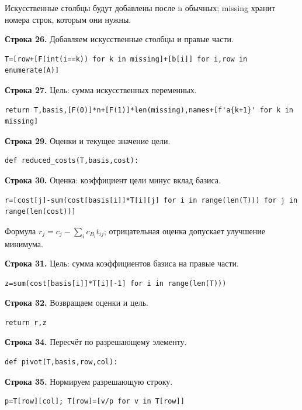 \documentclass[12pt,a4paper]{article}
\begin{document}
Искусственные столбцы будут добавлены после n обычных; missing хранит номера строк, которым они нужны.
\par\textbf{Строка 26.} Добавляем искусственные столбцы и правые части.
\begin{Verbatim}[fontsize=\small,breaklines=true,breakanywhere=true]
    T=[row+[F(int(i==k)) for k in missing]+[b[i]] for i,row in enumerate(A)]
\end{Verbatim}
\par\textbf{Строка 27.} Цель: сумма искусственных переменных.
\begin{Verbatim}[fontsize=\small,breaklines=true,breakanywhere=true]
    return T,basis,[F(0)]*n+[F(1)]*len(missing),names+[f'a{k+1}' for k in missing]
\end{Verbatim}
\par\textbf{Строка 29.} Оценки и текущее значение цели.
\begin{Verbatim}[fontsize=\small,breaklines=true,breakanywhere=true]
def reduced_costs(T,basis,cost):
\end{Verbatim}
\par\textbf{Строка 30.} Оценка: коэффициент цели минус вклад базиса.
\begin{Verbatim}[fontsize=\small,breaklines=true,breakanywhere=true]
    r=[cost[j]-sum(cost[basis[i]]*T[i][j] for i in range(len(T))) for j in range(len(cost))]
\end{Verbatim}
Формула $r_j=c_j-\sum_i c_{B_i}t_{ij}$; отрицательная оценка допускает улучшение минимума.
\par\textbf{Строка 31.} Цель: сумма коэффициентов базиса на правые части.
\begin{Verbatim}[fontsize=\small,breaklines=true,breakanywhere=true]
    z=sum(cost[basis[i]]*T[i][-1] for i in range(len(T)))
\end{Verbatim}
\par\textbf{Строка 32.} Возвращаем оценки и цель.
\begin{Verbatim}[fontsize=\small,breaklines=true,breakanywhere=true]
    return r,z
\end{Verbatim}
\par\textbf{Строка 34.} Пересчёт по разрешающему элементу.
\begin{Verbatim}[fontsize=\small,breaklines=true,breakanywhere=true]
def pivot(T,basis,row,col):
\end{Verbatim}
\par\textbf{Строка 35.} Нормируем разрешающую строку.
\begin{Verbatim}[fontsize=\small,breaklines=true,breakanywhere=true]
    p=T[row][col]; T[row]=[v/p for v in T[row]]
\end{Verbatim}
\end{document}
